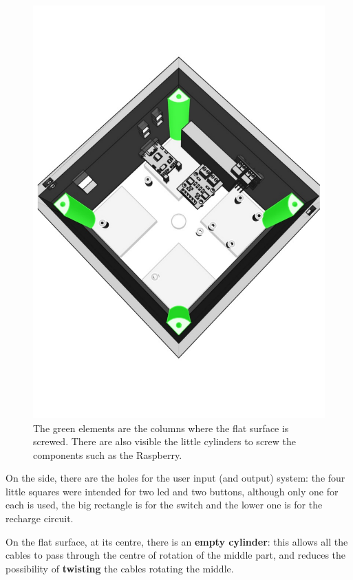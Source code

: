 \documentclass[]{article}
\begin{document}
\begin{figure}[H]
	\centering
	\includegraphics[trim=0 100 0 100 , clip,  width=0.5\linewidth]{images/design/base/base_columns}
	\caption[Bottom of the base]{The green elements are the columns where the flat surface is screwed. There are also visible the little cylinders to screw the components such as the Raspberry.}
	\label{fig:basebottom}
\end{figure}

On the side, there are the holes for the user input (and output) system: the four little squares were intended for two led and two buttons, although only one for each is used,  the big rectangle is for the switch and the lower one is for the recharge circuit. 

On the flat surface, at its centre, there is an \textbf{empty cylinder}: this allows all the cables to pass through the centre of rotation of the middle part, and reduces the possibility of \textbf{twisting} the cables rotating the middle. 
\end{document}
